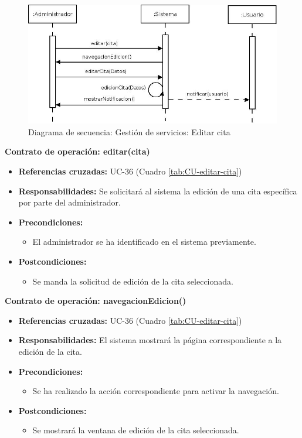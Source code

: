 \begin{figure}[h!]
\centering
  \includegraphics[scale=.50]{img/secuencias/gestion-servicios-editar-cita.jpeg}
  \caption{Diagrama de secuencia: Gestión de servicios: Editar cita}
  \label{fig:secuencia-gestion-servicios-editar-cita}
\end{figure}

\textbf{Contrato de operación: editar(cita)}
\begin{itemize}
\item \textbf{Referencias cruzadas:} UC-36 (Cuadro \ref{tab:CU-editar-cita})
\item \textbf{Responsabilidades:} Se solicitará al sistema la edición de una cita específica por parte del administrador.
\item \textbf{Precondiciones:} 
 \begin{itemize}
\item El administrador se ha identificado en el sistema previamente.
\end {itemize}
\item \textbf{Postcondiciones:} 
 \begin{itemize}
\item Se manda la solicitud de edición de la cita seleccionada.
\end {itemize}
\end {itemize}

\textbf{Contrato de operación: navegacionEdicion()}
\begin{itemize}
\item \textbf{Referencias cruzadas:} UC-36 (Cuadro \ref{tab:CU-editar-cita})
\item \textbf{Responsabilidades:} El sistema mostrará la página correspondiente a la edición de la cita.
\item \textbf{Precondiciones:} 
 \begin{itemize}
\item Se ha realizado la acción correspondiente para activar la navegación.
\end {itemize}
\item \textbf{Postcondiciones:} 
 \begin{itemize}
\item Se mostrará la ventana de edición de la cita seleccionada.
\end {itemize}
\end {itemize}


